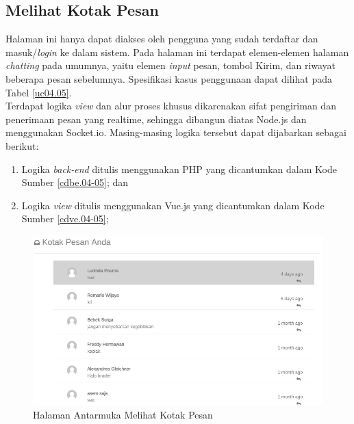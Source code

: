 \subsection{Melihat Kotak Pesan}

Halaman ini hanya dapat diakses oleh pengguna yang sudah terdaftar dan masuk/\textit{login} ke dalam sistem. Pada halaman ini terdapat elemen-elemen halaman \textit{chatting} pada umumnya, yaitu elemen \textit{input} pesan, tombol Kirim, dan riwayat beberapa pesan sebelumnya. Spesifikasi kasus penggunaan dapat dilihat pada Tabel \ref{uc04.05}.\\
\indent Terdapat logika \textit{view} dan alur proses khusus dikarenakan sifat pengiriman dan penerimaan pesan yang realtime, sehingga dibangun diatas Node.js dan menggunakan Socket.io. Masing-masing logika tersebut dapat dijabarkan sebagai berikut:
\begin{enumerate}
	\item Logika \textit{back-end} ditulis menggunakan PHP yang dicantumkan dalam Kode Sumber \ref{cdbe.04-05}; dan
	\item Logika \textit{view} ditulis menggunakan Vue.js yang dicantumkan dalam Kode Sumber \ref{cdve.04-05};
\end{enumerate}

\begin{figure}[H]
	\centering
	\includegraphics[width=\textwidth]{images/bab4/ui/04-05.png}
	\caption{Halaman Antarmuka Melihat Kotak Pesan}
	\label{ui.04-05}
\end{figure}

